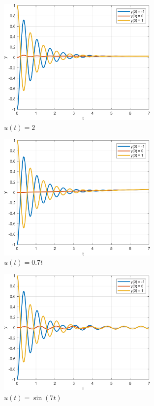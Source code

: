 \begin{figure}[ht]
    \centering
    \includegraphics[width=0.7\textwidth, trim={0cm 0cm 0cm 0cm}]{../images/1_1.png}
    \caption{$u(t) = 2$}
    \label{fig:1_1}
\end{figure}

\begin{figure}[ht]
    \centering
    \includegraphics[width=0.7\textwidth, trim={0cm 0cm 0cm 0cm}]{../images/1_2.png}
    \caption{$u(t) = 0.7t$}
    \label{fig:1_2}
\end{figure}

\begin{figure}[ht]
    \centering
    \includegraphics[width=0.7\textwidth, trim={0cm 0cm 0cm 0cm}]{../images/1_3.png}
    \caption{$u(t) = \sin(7t)$}
    \label{fig:1_3}
\end{figure}

